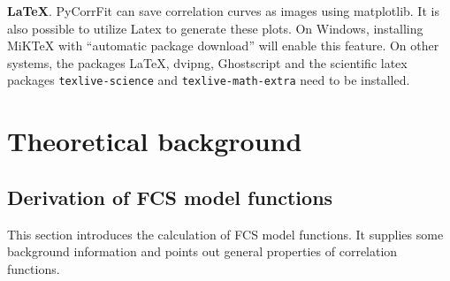 \noindent \textbf{\LaTeX}.
PyCorrFit can save correlation curves as images using matplotlib. It is also possible to utilize Latex to generate these plots. On Windows, installing MiKTeX  with ``automatic package download'' will enable this feature. On other systems, the packages LaTeX, dvipng, Ghostscript and the scientific latex packages \texttt{texlive-science} and \texttt{texlive-math-extra} need to be installed.


\section{Theoretical background}


\subsection{Derivation of FCS model functions}
This section introduces the calculation of FCS model functions. It supplies some background information and points out general properties of correlation functions.
	

